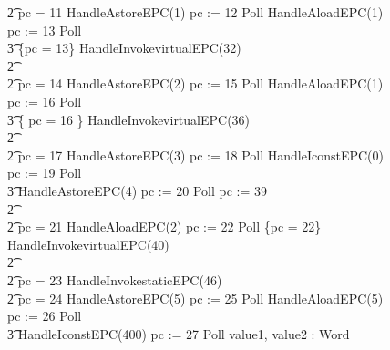 \begin{figure}[t!]
{\begin{circus}
    \t2 {} \circelse pc = 11 \circthen HandleAstoreEPC(1) \circseq pc := 12 \circseq Poll \circseq HandleAloadEPC(1) \circseq pc := 13 \circseq Poll \circseq \\
    \t3 \{pc = 13\} \circseq HandleInvokevirtualEPC(32) \\
    \t2 {} \cdots {} \\
    \t2 {} \circelse pc = 14 \circthen HandleAstoreEPC(2) \circseq pc := 15 \circseq Poll \circseq HandleAloadEPC(1) \circseq pc := 16 \circseq Poll \circseq \\
    \t3 \{ pc = 16 \} \circseq HandleInvokevirtualEPC(36) \\
    \t2 {} \cdots {} \\
    \t2 {} \circelse pc = 17 \circthen HandleAstoreEPC(3) \circseq pc := 18 \circseq Poll \circseq HandleIconstEPC(0) \circseq pc := 19 \circseq Poll \circseq \\
    \t3 HandleAstoreEPC(4) \circseq pc := 20 \circseq Poll \circseq pc := 39 \\
    \t2 {} \cdots {} \\
    \t2 {} \circelse pc = 21 \circthen HandleAloadEPC(2) \circseq pc := 22 \circseq Poll \circseq \{pc = 22\} \circseq HandleInvokevirtualEPC(40) \\
    \t2 {} \cdots {} \\
    \t2 {} \circelse pc = 23 \circthen HandleInvokestaticEPC(46) \\
    \t2 {} \circelse pc = 24 \circthen HandleAstoreEPC(5) \circseq pc := 25 \circseq Poll \circseq HandleAloadEPC(5) \circseq pc := 26 \circseq Poll \circseq \\
    \t3 HandleIconstEPC(400) \circseq pc := 27 \circseq Poll \circseq \circvar value1, value2 : Word \circspot \\

\end{circus}}
\end{figure}
